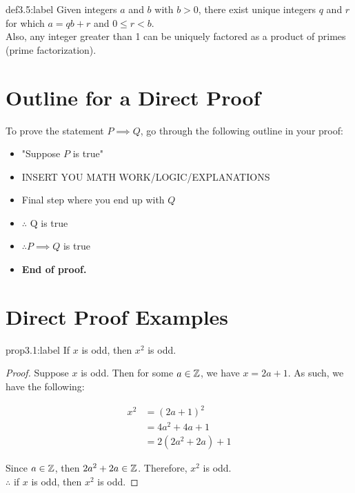 \begin{definition}{def3.5:label}
    Given integers $a$ and $b$ with $b>0$, there exist unique integers $q$ and $r$ for which $a=qb+r$ and $0 \le r < b$.\\

    Also, any integer greater than 1 can be uniquely factored as a product of primes (prime factorization).
\end{definition}

\section{Outline for a Direct Proof}

To prove the statement $P\implies Q$, go through the following outline in your proof:

\begin{itemize}
    \item "Suppose $P$ is true"
    \item INSERT YOU MATH WORK/LOGIC/EXPLANATIONS
    \item Final step where you end up with $Q$
    \item $\therefore$ Q is true
    \item $\therefore P \implies Q$ is true
    \item \textbf{End of proof.} 
\end{itemize}
\newpage

\section{Direct Proof Examples}

\begin{proposition}{prop3.1:label}
    If $x$ is odd, then $x^2$ is odd.
\end{proposition}

\begin{proof}
    Suppose $x$ is odd. Then for some $a \in \mathbb{Z}$, we have $x = 2a+1$. As such, we have the following:

    $$
    \begin{aligned}
        x^2 &= (2a+1)^2\\
        &= 4a^2 + 4a + 1\\
        &= 2(2a^2+2a)+1
    \end{aligned}
    $$

    Since $a \in \mathbb{Z}$, then $2a^2+2a \in \mathbb{Z}$. Therefore, $x^2$ is odd.\\

    $\therefore$ if $x$ is odd, then $x^2$ is odd.
\end{proof}


